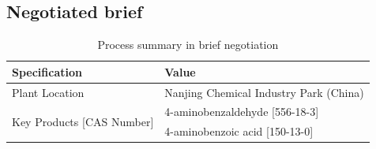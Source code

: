\begin{landscape}
\section{Negotiated brief}
\label{app:brief}

\begin{table}[h]
\centering\small
\caption{Process summary in brief negotiation}
\label{tab:brief}
\begin{tabular}{@{}lll@{}}
\toprule
\multicolumn{2}{l}{\textbf{Specification}}                              & \textbf{Value}                                                                                                                                                                                                                                                                                                                                                                                                        \\ \midrule
\multicolumn{2}{l}{Plant Location}                                       & Nanjing Chemical Industry Park (China)                                                                                                                                                                                                                                                                                                                                                                                \\ \midrule
\multicolumn{2}{l}{\multirow{3}{*}{Key Products {[}CAS Number{]}}}       & 4-aminobenzaldehyde {[}556-18-3{]}                                                                                                                                                                                                                                                                                                                                                                                    \\ \cmidrule(l){3-3} 
\multicolumn{2}{l}{}                                                     & 4-aminobenzoic acid {[}150-13-0{]}                                                                                                                                                                                                                                                                                                                                                                                    \\ \cmidrule(l){3-3} 

\end{tabular}
\end{table}
\end{landscape}

